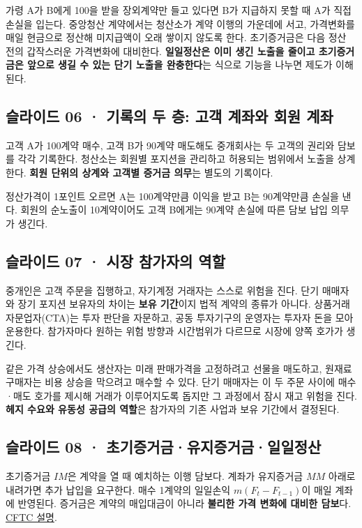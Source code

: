 \documentclass[11pt,a4paper]{article}
\begin{document}
가령 A가 B에게 100을 받을 장외계약만 들고 있다면 B가 지급하지 못할 때 A가 직접 손실을 입는다. 중앙청산 계약에서는 청산소가 계약 이행의 가운데에 서고, 가격변화를 매일 현금으로 정산해 미지급액이 오래 쌓이지 않도록 한다. 초기증거금은 다음 정산 전의 갑작스러운 가격변화에 대비한다. \textbf{일일정산은 이미 생긴 노출을 줄이고 초기증거금은 앞으로 생길 수 있는 단기 노출을 완충한다}는 식으로 기능을 나누면 제도가 이해된다.\par

\subsection{슬라이드 06 · 기록의 두 층: 고객 계좌와 회원 계좌}
고객 A가 100계약 매수, 고객 B가 90계약 매도해도 중개회사는 두 고객의 권리와 담보를 각각 기록한다. 청산소는 회원별 포지션을 관리하고 허용되는 범위에서 노출을 상계한다. \textbf{회원 단위의 상계와 고객별 증거금 의무}는 별도의 기록이다.\par

정산가격이 1포인트 오르면 A는 100계약만큼 이익을 받고 B는 90계약만큼 손실을 낸다. 회원의 순노출이 10계약이어도 고객 B에게는 90계약 손실에 따른 담보 납입 의무가 생긴다.\par

\subsection{슬라이드 07 · 시장 참가자의 역할}
중개인은 고객 주문을 집행하고, 자기계정 거래자는 스스로 위험을 진다. 단기 매매자와 장기 포지션 보유자의 차이는 \textbf{보유 기간}이지 법적 계약의 종류가 아니다. 상품거래자문업자(CTA)는 투자 판단을 자문하고, 공동 투자기구의 운영자는 투자자 돈을 모아 운용한다. 참가자마다 원하는 위험 방향과 시간범위가 다르므로 시장에 양쪽 호가가 생긴다.\par

같은 가격 상승에서도 생산자는 미래 판매가격을 고정하려고 선물을 매도하고, 원재료 구매자는 비용 상승을 막으려고 매수할 수 있다. 단기 매매자는 이 두 주문 사이에 매수·매도 호가를 제시해 거래가 이루어지도록 돕지만 그 과정에서 잠시 재고 위험을 진다. \textbf{헤지 수요와 유동성 공급의 역할}은 참가자의 기존 사업과 보유 기간에서 결정된다.\par

\subsection{슬라이드 08 · 초기증거금·유지증거금·일일정산}
초기증거금 $IM$은 계약을 열 때 예치하는 이행 담보다. 계좌가 유지증거금 $MM$ 아래로 내려가면 추가 납입을 요구한다. 매수 1계약의 일일손익 $m(F_t-F_{t-1})$이 매일 계좌에 반영된다. 증거금은 계약의 매입대금이 아니라 \textbf{불리한 가격 변화에 대비한 담보}다. \href{https://www.cftc.gov/LearnAndProtect/EducationCenter/economicpurpose}{CFTC 설명}.\par
\end{document}
